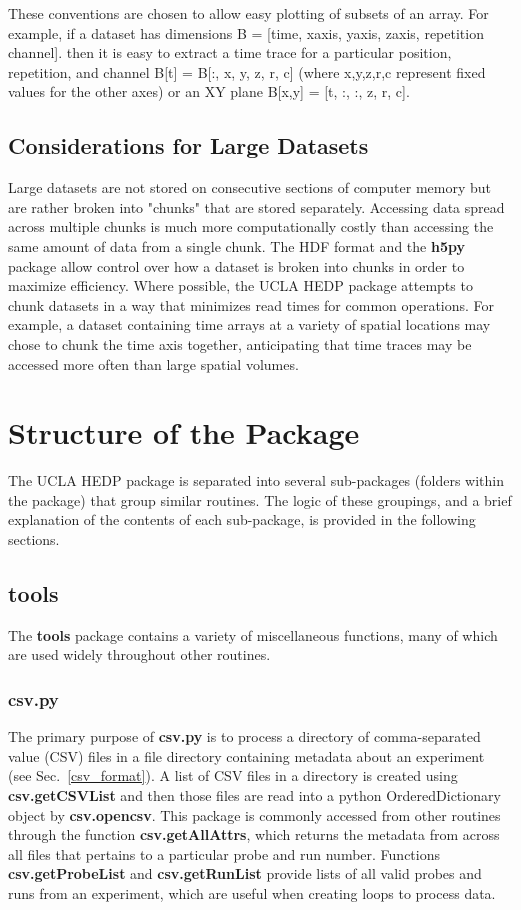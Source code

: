 \documentclass[12pt]{article}
\newcommand{\loc}[1]{{\bf \fontfamily{pcr}\selectfont #1}}
\begin{document}
These conventions are chosen to allow easy plotting of subsets of an array. For example, if a dataset has dimensions B = [time, xaxis, yaxis, zaxis, repetition channel]. then it is easy to extract a time trace for a particular position, repetition, and channel B[t] = B[:, x, y, z, r, c] (where x,y,z,r,c represent fixed values for the other axes) or an XY plane B[x,y] = [t, :, :, z, r, c]. 

\subsection{Considerations for Large Datasets}

Large datasets are not stored on consecutive sections of computer memory but are rather broken into "chunks" that are stored separately. Accessing data spread across multiple chunks is much more computationally costly than accessing the same amount of data from a single chunk. The HDF format and the \loc{h5py} package allow control over how a dataset is broken into chunks in order to maximize efficiency. Where possible, the UCLA HEDP package attempts to chunk datasets in a way that minimizes read times for common operations. For example, a dataset containing time arrays at a variety of spatial locations may chose to chunk the time axis together, anticipating that time traces may be accessed more often than large spatial volumes.


\section{Structure of the Package}

The UCLA HEDP package is separated into several sub-packages (folders within the package) that group similar routines. The logic of these groupings, and a brief explanation of the contents of each sub-package, is provided in the following sections.


\subsection{\loc{tools}}

The \loc{tools} package contains a variety of miscellaneous functions, many of which are used widely throughout other routines.
\subsubsection{\loc{csv.py}}

The primary purpose of \loc{csv.py} is to process a directory of comma-separated value (CSV) files in a file directory containing metadata about an experiment (see Sec.~\ref{csv_format}).  A list of CSV files in a directory is created using \loc{csv.getCSVList} and then those files are read into a python OrderedDictionary object by \loc{csv.opencsv}. This package is commonly accessed from other routines through the function \loc{csv.getAllAttrs}, which returns the metadata from across all files that pertains to a particular probe and run number. Functions \loc{csv.getProbeList} and \loc{csv.getRunList} provide lists of all valid probes and runs from an experiment, which are useful when creating loops to process data.
\end{document}
